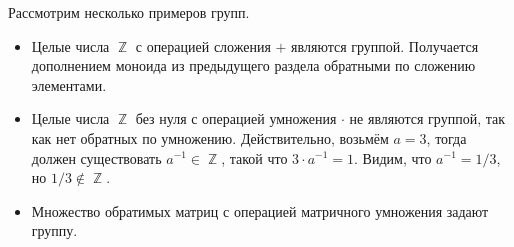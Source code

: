 \begin{example}
    Рассмотрим несколько примеров групп.
    \begin{itemize}
        \item Целые числа $\BbbZ$ с операцией сложения $+$ являются группой.
              Получается дополнением моноида из предыдущего раздела обратными по сложению элементами.
        \item Целые числа $\BbbZ$ без нуля%
              с операцией умножения $\cdot$ не являются группой, так как нет обратных по умножению.
              Действительно, возьмём $a = 3$, тогда должен существовать $a^{-1} \in \BbbZ$, такой что $3 \cdot a^{-1} = 1$.
              Видим, что $a^{-1} = 1/3$, но $1/3 \notin \BbbZ$.
        \item Множество обратимых%
              матриц с операцией матричного умножения задают группу.
    \end{itemize}
\end{example}

